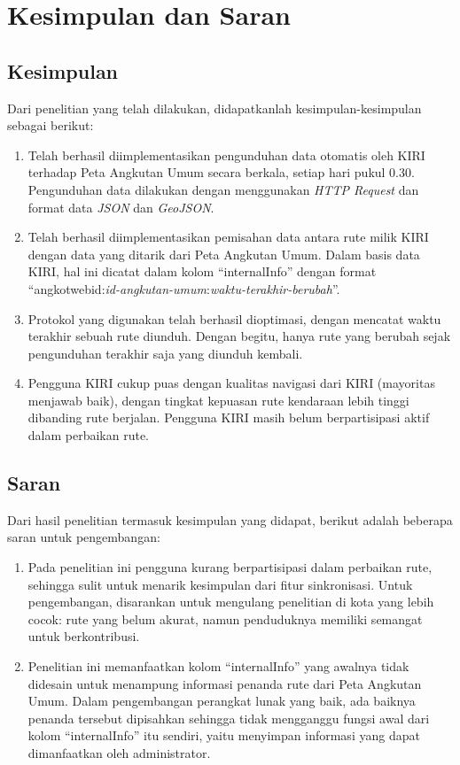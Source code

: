 \chapter{Kesimpulan dan Saran}

\section{Kesimpulan}

Dari penelitian yang telah dilakukan, didapatkanlah kesimpulan-kesimpulan sebagai berikut:

\begin{enumerate}
	\item Telah berhasil diimplementasikan pengunduhan data otomatis oleh KIRI terhadap Peta Angkutan Umum secara berkala, setiap hari pukul 0.30. Pengunduhan data dilakukan dengan menggunakan \textit{HTTP Request} dan format data \textit{JSON} dan \textit{GeoJSON}.
	\item Telah berhasil diimplementasikan pemisahan data antara rute milik KIRI dengan data yang ditarik dari Peta Angkutan Umum. Dalam basis data KIRI, hal ini dicatat dalam kolom ``internalInfo'' dengan format ``angkotwebid:\textit{id-angkutan-umum}:\textit{waktu-terakhir-berubah}''.
	\item Protokol yang digunakan telah berhasil dioptimasi, dengan mencatat waktu terakhir sebuah rute diunduh. Dengan begitu, hanya rute yang berubah sejak pengunduhan terakhir saja yang diunduh kembali.
	\item Pengguna KIRI cukup puas dengan kualitas navigasi dari KIRI (mayoritas menjawab baik), dengan tingkat kepuasan rute kendaraan lebih tinggi dibanding rute berjalan. Pengguna KIRI masih belum berpartisipasi aktif dalam perbaikan rute.
\end{enumerate}

\section{Saran}

Dari hasil penelitian termasuk kesimpulan yang didapat, berikut adalah beberapa saran untuk pengembangan:

\begin{enumerate}
	\item Pada penelitian ini pengguna kurang berpartisipasi dalam perbaikan rute, sehingga sulit untuk menarik kesimpulan dari fitur sinkronisasi. Untuk pengembangan, disarankan untuk mengulang penelitian di kota yang lebih cocok: rute yang belum akurat, namun penduduknya memiliki semangat untuk berkontribusi.
	\item Penelitian ini memanfaatkan kolom ``internalInfo'' yang awalnya tidak didesain untuk menampung informasi penanda rute dari Peta Angkutan Umum. Dalam pengembangan perangkat lunak yang baik, ada baiknya penanda tersebut dipisahkan sehingga tidak mengganggu fungsi awal dari kolom ``internalInfo'' itu sendiri, yaitu menyimpan informasi yang dapat dimanfaatkan oleh administrator.
\end{enumerate}